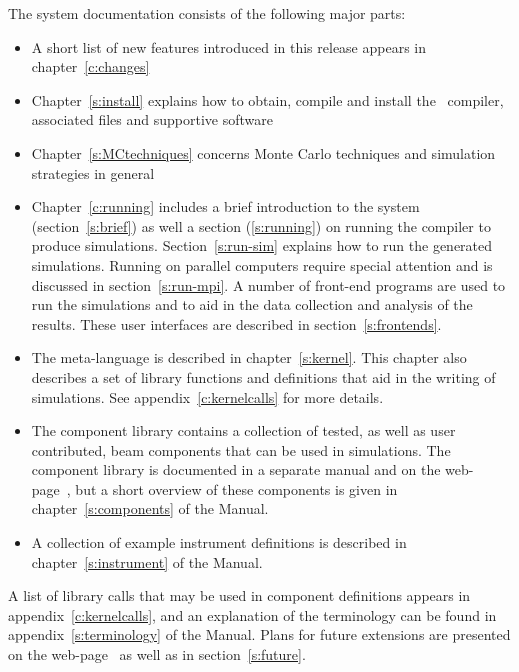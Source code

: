 The \MCX system documentation consists of the following major
parts:
\begin{itemize}
\item A short list of new features introduced in this \MCX release
  appears in chapter~\ref{c:changes}
\item Chapter~\ref{s:install} explains how to obtain, compile
  and install the \MCX\ compiler, associated files and supportive software
\item Chapter~\ref{s:MCtechniques} concerns Monte Carlo techniques
  and simulation strategies in general
\item Chapter~\ref{c:running} includes a brief introduction to the
  \MCX system
  (section~\ref{s:brief}) as well a section (\ref{s:running}) on running the compiler to produce
  simulations. Section~\ref{s:run-sim} explains how to run the generated
  simulations. Running \MCX on parallel computers require special
  attention and is discussed in section~\ref{s:run-mpi}. A number of front-end programs are used to run the
  simulations and to aid in the data collection and analysis of the
  results. These user interfaces are described in section~\ref{s:frontends}.
\item The \MCX meta-language is described in chapter~\ref{s:kernel}. This
  chapter also describes a set of library functions and definitions
  that aid in the writing of simulations. See
  appendix~\ref{c:kernelcalls} for more details.
\item The \MCX component library contains a collection of
  tested, as well as user contributed, beam components that can be used in simulations.
  The \MCX component library is documented in a separate manual
  and on the \MCX web-page~\cite{mcxtrace_webpage}, but a short overview of these
  components is given in chapter~\ref{s:components} of the Manual.
\item A collection of example instrument definitions is described in
  chapter~\ref{s:instrument} of the Manual.%

\end{itemize}

A list of library calls that may be used in component definitions
appears in appendix~\ref{c:kernelcalls}, and
an explanation of the \MCX terminology can be
found in appendix~\ref{s:terminology} of the Manual.
Plans for future extensions are presented on the \MCX web-page~\cite{mcxtrace_webpage} as well as in section~\ref{s:future}.



